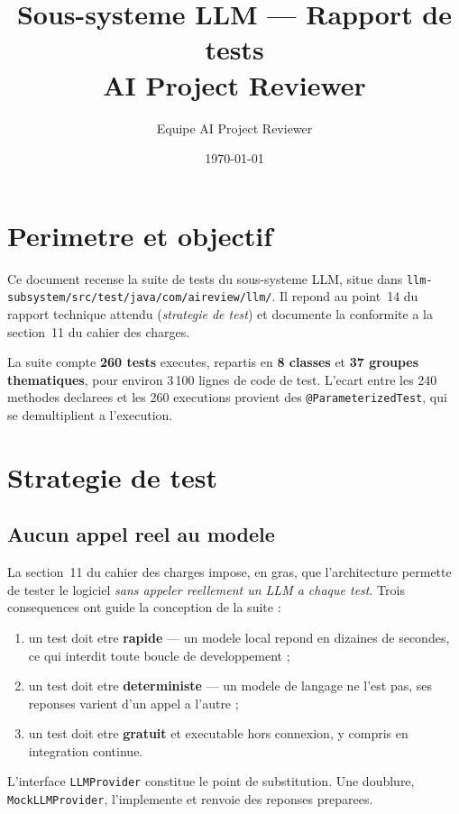 \documentclass[12pt,a4paper]{article}
\title{\textbf{Sous-systeme LLM --- Rapport de tests}\\
       \large AI Project Reviewer}
\author{Equipe AI Project Reviewer}
\date{\today}
\begin{document}
\maketitle

\section{Perimetre et objectif}

Ce document recense la suite de tests du sous-systeme LLM, situe dans
\texttt{llm-subsystem/src/test/java/com/aireview/llm/}. Il repond au point~14 du
rapport technique attendu (\emph{strategie de test}) et documente la conformite a
la section~11 du cahier des charges.

La suite compte \textbf{260 tests} executes, repartis en \textbf{8 classes} et
\textbf{37 groupes thematiques}, pour environ 3\,100 lignes de code de test.
L'ecart entre les 240 methodes declarees et les 260 executions provient des
\texttt{@ParameterizedTest}, qui se demultiplient a l'execution.

\section{Strategie de test}

\subsection{Aucun appel reel au modele}

La section~11 du cahier des charges impose, en gras, que l'architecture permette
de tester le logiciel \emph{sans appeler reellement un LLM a chaque test}. Trois
consequences ont guide la conception de la suite :

\begin{enumerate}[leftmargin=*]
  \item un test doit etre \textbf{rapide} --- un modele local repond en dizaines
        de secondes, ce qui interdit toute boucle de developpement ;
  \item un test doit etre \textbf{deterministe} --- un modele de langage ne l'est
        pas, ses reponses varient d'un appel a l'autre ;
  \item un test doit etre \textbf{gratuit} et executable hors connexion, y compris
        en integration continue.
\end{enumerate}

L'interface \texttt{LLMProvider} constitue le point de substitution. Une doublure,
\texttt{MockLLMProvider}, l'implemente et renvoie des reponses preparees.
\end{document}
